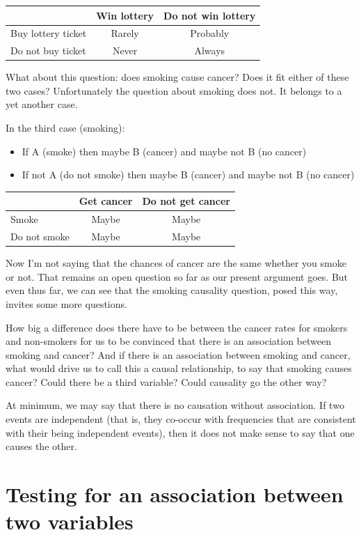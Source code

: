 \documentclass[
  openany]{book}
\providecommand{\tightlist}{%
  \setlength{\itemsep}{0pt}\setlength{\parskip}{0pt}}
\begin{document}
\begin{longtable}[]{@{}lcc@{}}
\toprule
& Win lottery & Do not win lottery \\
\midrule
\endhead
Buy lottery ticket & Rarely & Probably \\
Do not buy ticket & Never & Always \\
\bottomrule
\end{longtable}

What about this question: does smoking cause cancer? Does it fit either of these two cases? Unfortunately the question about smoking does not. It belongs to a yet another case.

In the third case (smoking):

\begin{itemize}
\tightlist
\item
  If A (smoke) then maybe B (cancer) and maybe not B (no cancer)
\item
  If not A (do not smoke) then maybe B (cancer) and maybe not B (no cancer)
\end{itemize}

\begin{longtable}[]{@{}lcc@{}}
\toprule
& Get cancer & Do not get cancer \\
\midrule
\endhead
Smoke & Maybe & Maybe \\
Do not smoke & Maybe & Maybe \\
\bottomrule
\end{longtable}

Now I'm not saying that the chances of cancer are the same whether you smoke or not. That remains an open question so far as our present argument goes. But even thus far, we can see that the smoking causality question, posed this way, invites some more questions.

How big a difference does there have to be between the cancer rates for smokers and non-smokers for us to be convinced that there is an association between smoking and cancer? And if there is an association between smoking and cancer, what would drive us to call this a causal relationship, to say that smoking causes cancer? Could there be a third variable? Could causality go the other way?

At minimum, we may say that there is no causation without association. If two events are independent (that is, they co-occur with frequencies that are consistent with their being independent events), then it does not make sense to say that one causes the other.

\hypertarget{testing-for-an-association-between-two-variables}{%
\section*{Testing for an association between two variables}\label{testing-for-an-association-between-two-variables}}
\end{document}
